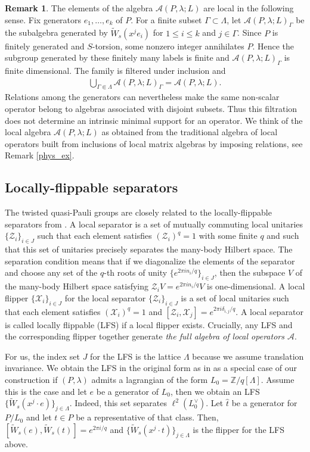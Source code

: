 \documentclass[sn-mathphys-num]{sn-jnl}
\theoremstyle{definition}
\newtheorem{remark}[lemma]{Remark}
\numberwithin{equation}{section}
\theoremstyle{definition}
\def\CA{{\mathcal A}}
\def\CX {{\mathcal X}}
\def\CZ {{\mathcal Z}}
\def\CX {{\mathcal X}}
\def\CZ{{\mathcal Z}}
\def\IZ{{\mathbb{Z}}}
\def\La{{\Lambda}}
\def\l{{\lambda}}
\begin{document}
\begin{remark} The elements of the algebra $  \CA(P,\l;L)$ are local in the following sense. Fix generators $e_1,\ldots,e_k$ of $P$. For a finite subset $\Gamma\subset\La$, let $\CA(P,\l;L)_\Gamma$ be the subalgebra generated by $\widetilde W_s(x^je_i)$ for $1\leqslant i\leqslant k$ and $j\in\Gamma$. Since $P$ is finitely generated and $S$-torsion, some nonzero integer annihilates $P$. Hence the subgroup generated by these finitely many labels is finite and $\CA(P,\l;L)_\Gamma$ is finite dimensional. The family is filtered under inclusion and 
\begin{align} 
\bigcup_{\Gamma\Subset\La}\CA(P,\l;L)_\Gamma = \CA(P,\l;L).
\end{align}
Relations among the generators can nevertheless make the same non-scalar operator belong to algebras associated with disjoint subsets. Thus this filtration does not determine an intrinsic minimal support for an operator. 
We think of the local algebra $\CA(P,\l;L)$ as obtained from the traditional algebra of local operators built from inclusions of local matrix algebras by imposing relations, see Remark \ref{phys_ex}.
\end{remark}

\subsection{Locally-flippable separators} The twisted quasi-Pauli groups are closely related to the locally-flippable separators from \cite{haah2023nontrivial}. A local separator is a set of mutually commuting local unitaries $\{\CZ_{i}\}_{i\in J}$ such that each element satisfies $(\CZ_{i})^q=1$ with some finite $q$ and such that this set of unitaries precisely separates the many-body Hilbert space. The separation condition means that if we diagonalize the elements of the separator and choose any set of the $q$-th roots of unity $\{e^{2\pi i n_{i}/q}\}_{i\in J}$, then the subspace $V$ of the many-body Hilbert space satisfying $\CZ_{i}V=e^{2\pi in_i/q}V$ is one-dimensional.  A local flipper $\{\CX_{i}\}_{i\in J}$ for the local separator 
$\{\CZ_{i}\}_{i\in J}$ is a set of local unitaries such that each element satisfies $(\CX_{i})^q=1$ and $[\CZ_i,\CX_j]=e^{2\pi i\delta_{i,j}/q}$. A local separator is called locally flippable (LFS) if a local flipper exists. Crucially, any LFS and the corresponding flipper together generate \textit{the full algebra of local operators $\CA$}.

For us, the index set $J$ for the LFS is the lattice $\La$ because we assume translation invariance. We obtain the LFS in the original form as in \cite{haah2023nontrivial} as a special case of our construction if $(P,\l)$ admits a lagrangian of the form  $L_0=\IZ/q[\La]$. Assume this is the case and let $e$ be a generator of $L_0$, then we obtain an LFS $\{\widetilde{W}_s(x^j\cdot e)\}_{j\in \La}$. Indeed, this set separates $\ell^2(L_0^{\vee})$. Let $\hat t$ be a generator for $P/L_0$ and let $t\in P$ be a representative of that class. Then, $[\widetilde{W}_s( e),\widetilde{W}_s(t)]=e^{2\pi i/q}$ and $\{\widetilde{W}_s(x^j\cdot t)\}_{j\in \La}$ is the flipper for the LFS above. 
\end{document}
